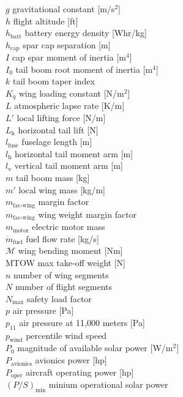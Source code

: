 \documentclass[]{aiaa-tc}%
\begin{document}
\begin{multicols}{2}
\begin{tabbing}
$g$ \> gravitational constant [m/s$^2$] \\
$h$ \> flight altitude [ft] \\
$h_{\text{batt}}$ \> battery energy density [Whr/kg] \\
$h_{\text{cap}}$ \> spar cap separation [m] \\
$I$ \> cap spar moment of inertia [m$^4$] \\
$I_0$ \> tail boom root moment of inertia [m$^4$] \\
$k$ \> tail boom taper index \\
$K_q$ \> wing loading constant [N/m$^2$] \\
$L$ \> atmospheric lapse rate [K/m] \\
$L'$ \> local lifting force [N/m] \\
$L_\text{h}$ \> horizontal tail lift [N] \\
$l_\text{fuse}$ \> fuselage length [m] \\
$l_\text{h}$ \> horizontal tail moment arm [m] \\
$l_\text{v}$ \> vertical tail moment arm [m] \\
$m$ \> tail boom mass [kg] \\
$m'$ \> local wing mass [kg/m] \\
$m_{\text{fac-wing}}$ \> margin factor\\
$m_{\text{fac-wing}}$ \> wing weight margin factor \\
$m_{\text{motor}}$ \> electric motor mass \\
$\dot{m}_{\text{fuel}}$ \> fuel flow rate [kg/s] \\
$\mathcal{M}$ \> wing bending moment [Nm] \\
MTOW \> max take-off weight [N] \\
$n$ \> number of wing segments \\
$N$ \> number of flight segments \\
$N_{\text{max}}$ \> safety load factor\\
$p$ \> air pressure [Pa]\\
$p_{11}$ \> air pressure at 11,000 meters [Pa]\\
$p_{\text{wind}}$ \> percentile wind speed \\
$P_{0}$ \> magnitude of available solar power [W/m$^2$] \\
$P_{\text{avionics}}$ \> avionics power [hp] \\
$P_{\text{oper}}$ \> aircraft operating power [hp] \\
$(P/S)_{\text{min}}$ \> minium operational solar power \\

\end{tabbing}
\end{multicols}
\end{document}
